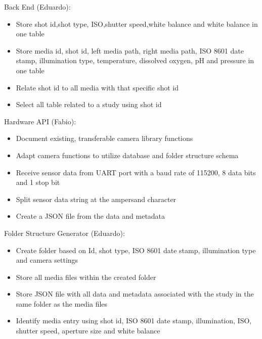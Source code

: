 Back End (Eduardo):
\begin{itemize}
	\item Store shot id,shot type, ISO,shutter speed,white balance and white balance in one table
	\item Store media id, shot id, left media path, right media path, ISO 8601 date stamp, illumination type, temperature, dissolved oxygen, pH and pressure in one table
	\item Relate shot id to all media with that specific shot id
	\item Select all table related to a study using shot id
\end{itemize}
Hardware API (Fabio):
\begin{itemize}
	\item Document existing, transferable camera library functions
	\item Adapt camera functions to utilize database and folder structure schema
	\item Receive sensor data from UART port with a baud rate of 115200, 8 data bits and 1 stop bit
	\item Split sensor data string at the ampersand character
	\item Create a JSON file from the data and metadata
\end{itemize}
Folder Structure Generator (Eduardo):
\begin{itemize}
	\item Create folder based on Id, shot type, ISO 8601 date stamp, illumination type and camera settings
	\item Store all media files within the created folder
	\item Store JSON file with all data and metadata associated with the study in the same folder as the media files
	\item Identify media entry using shot id, ISO 8601 date stamp, illumination, ISO, shutter speed, aperture size and white balance
\end{itemize}